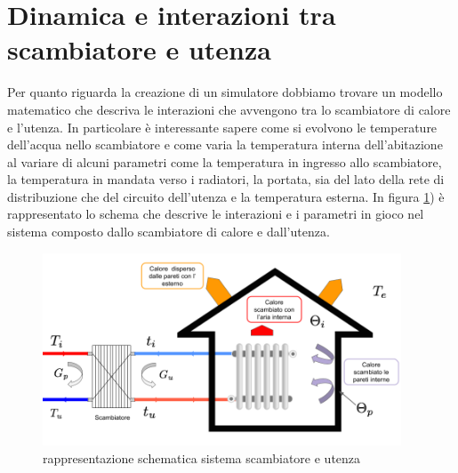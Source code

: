 \documentclass[laurea,oneside,11pt]{USiena_tesiLM}
\begin{document}
%
%

\section{Dinamica e interazioni tra scambiatore e utenza}
Per quanto riguarda la creazione di un simulatore dobbiamo trovare un modello matematico che descriva le interazioni che avvengono tra lo scambiatore di calore e l'utenza. In particolare è interessante sapere come si evolvono le temperature dell'acqua nello scambiatore e come varia la temperatura interna dell'abitazione al variare di alcuni parametri come la temperatura in ingresso allo scambiatore, la temperatura in mandata verso i radiatori, la portata, sia del lato della rete di distribuzione che del circuito dell'utenza e la temperatura esterna.
In figura \ref{fig:scamb_utenza}) è rappresentato lo schema che descrive le interazioni e i parametri in gioco nel sistema composto dallo scambiatore di calore e dall'utenza. 

\begin{figure}[h]
\begin{center}
\includegraphics[width=0.95\textwidth]{figure/scamb_utenza} %
\caption{rappresentazione schematica sistema scambiatore e utenza}
\label{fig:scamb_utenza}
\end{center}
\end{figure}
\end{document}
